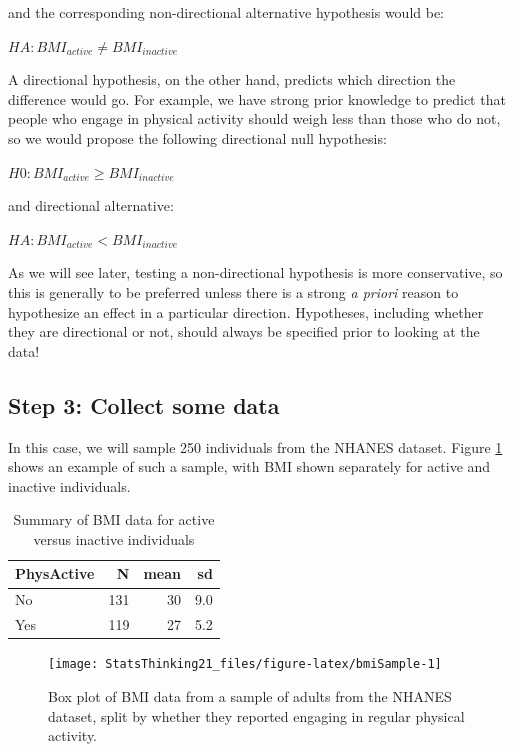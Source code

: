 \documentclass[12pt,]{book}
\theoremstyle{definition}
\theoremstyle{definition}
\theoremstyle{definition}
\theoremstyle{remark}
\begin{document}
and the corresponding non-directional alternative hypothesis would be:

\(HA: BMI_{active} \neq BMI_{inactive}\)

A directional hypothesis, on the other hand, predicts which direction the difference would go. For example, we have strong prior knowledge to predict that people who engage in physical activity should weigh less than those who do not, so we would propose the following directional null hypothesis:

\(H0: BMI_{active} \ge BMI_{inactive}\)

and directional alternative:

\(HA: BMI_{active} < BMI_{inactive}\)

As we will see later, testing a non-directional hypothesis is more conservative, so this is generally to be preferred unless there is a strong \emph{a priori} reason to hypothesize an effect in a particular direction. Hypotheses, including whether they are directional or not, should always be specified prior to looking at the data!

\hypertarget{step-3-collect-some-data}{%
\subsection{Step 3: Collect some data}\label{step-3-collect-some-data}}

In this case, we will sample 250 individuals from the NHANES dataset. Figure \ref{fig:bmiSample} shows an example of such a sample, with BMI shown separately for active and inactive individuals.

\begin{table}

\caption{\label{tab:unnamed-chunk-42}Summary of BMI data for active versus inactive individuals}
\centering
\begin{tabular}[t]{l|r|r|r}
\hline
PhysActive & N & mean & sd\\
\hline
No & 131 & 30 & 9.0\\
\hline
Yes & 119 & 27 & 5.2\\
\hline
\end{tabular}
\end{table}

\begin{figure}
\texttt{[image: StatsThinking21\_files/figure-latex/bmiSample-1]} \caption{Box plot of BMI data from a sample of adults from the NHANES dataset, split by whether they reported engaging in regular physical activity.}\label{fig:bmiSample}
\end{figure}
\end{document}
